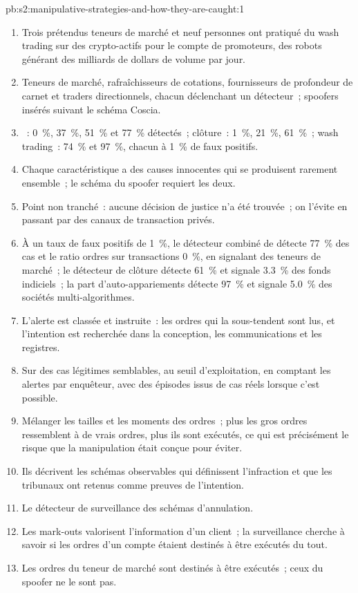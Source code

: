 \begin{solution}{pb:s2:manipulative-strategies-and-how-they-are-caught:1}
\begin{enumerate}
\item Trois prétendus teneurs de marché et neuf personnes ont pratiqué du wash trading sur des crypto-actifs pour le compte de promoteurs, des robots générant des milliards de dollars de volume par
jour.
\item Teneurs de marché, rafraîchisseurs de cotations, fournisseurs de profondeur de carnet et traders directionnels, chacun déclenchant un détecteur~; spoofers insérés suivant le
schéma Coscia.
\item {}~: 0~\%, 37~\%, 51~\% et 77~\% détectés~; clôture~: 1~\%, 21~\%, 61~\%~; wash trading~: 74~\% et 97~\%, chacun à 1~\% de faux positifs.
\item Chaque caractéristique a des causes innocentes qui se produisent rarement ensemble~; le schéma du spoofer requiert les deux.
\item Point non tranché~: aucune décision de justice n'a été trouvée~; on l'évite en passant par des canaux de transaction privés.
\item À un taux de faux positifs de 1~\%, le détecteur combiné de  détecte 77~\% des cas et le ratio ordres sur transactions 0~\%, en signalant des teneurs de marché~; le détecteur de clôture
détecte 61~\% et signale 3.3~\% des fonds indiciels~; la part d'auto-appariements détecte 97~\% et signale 5.0~\% des sociétés multi-algorithmes.
\item L'alerte est classée et instruite~: les ordres qui la sous-tendent sont lus, et l'intention est recherchée dans la conception, les communications et les registres.
\item Sur des cas légitimes semblables, au seuil d'exploitation, en comptant les alertes par enquêteur, avec des épisodes issus de cas réels lorsque c'est possible.
\item Mélanger les tailles et les moments des ordres~; plus les gros ordres ressemblent à de vrais ordres, plus ils sont exécutés, ce qui est précisément le risque que la
manipulation était conçue pour éviter.
\item Ils décrivent les schémas observables qui définissent l'infraction et que les tribunaux ont retenus comme preuves de l'intention.
\item Le détecteur de surveillance des schémas d'annulation.
\item Les mark-outs valorisent l'information d'un client~; la surveillance cherche à savoir si les ordres d'un compte étaient destinés à être exécutés du tout.
\item Les ordres du teneur de marché sont destinés à être exécutés~; ceux du spoofer ne le sont pas.
\end{enumerate}
\end{solution}

